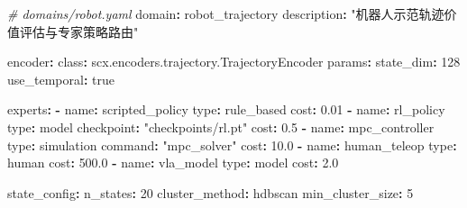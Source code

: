 \documentclass[
  12pt,
]{ctexart}
\newenvironment{Shaded}{}{}
\newcommand{\AttributeTok}[1]{\textcolor[rgb]{0.49,0.56,0.16}{#1}}
\newcommand{\CharTok}[1]{\textcolor[rgb]{0.25,0.44,0.63}{#1}}
\newcommand{\CommentTok}[1]{\textcolor[rgb]{0.38,0.63,0.69}{\textit{#1}}}
\newcommand{\DecValTok}[1]{\textcolor[rgb]{0.25,0.63,0.44}{#1}}
\newcommand{\FloatTok}[1]{\textcolor[rgb]{0.25,0.63,0.44}{#1}}
\newcommand{\FunctionTok}[1]{\textcolor[rgb]{0.02,0.16,0.49}{#1}}
\newcommand{\KeywordTok}[1]{\textcolor[rgb]{0.00,0.44,0.13}{\textbf{#1}}}
\newcommand{\StringTok}[1]{\textcolor[rgb]{0.25,0.44,0.63}{#1}}
\begin{document}
\begin{Shaded}
\begin{Highlighting}[]
\CommentTok{\# domains/robot.yaml}
\FunctionTok{domain}\KeywordTok{:}\AttributeTok{ robot\_trajectory}
\FunctionTok{description}\KeywordTok{:}\AttributeTok{ }\StringTok{"机器人示范轨迹价值评估与专家策略路由"}

\FunctionTok{encoder}\KeywordTok{:}
\AttributeTok{  }\FunctionTok{class}\KeywordTok{:}\AttributeTok{ scx.encoders.trajectory.TrajectoryEncoder}
\AttributeTok{  }\FunctionTok{params}\KeywordTok{:}
\AttributeTok{    }\FunctionTok{state\_dim}\KeywordTok{:}\AttributeTok{ }\DecValTok{128}
\AttributeTok{    }\FunctionTok{use\_temporal}\KeywordTok{:}\AttributeTok{ }\CharTok{true}

\FunctionTok{experts}\KeywordTok{:}
\AttributeTok{  }\KeywordTok{{-}}\AttributeTok{ }\FunctionTok{name}\KeywordTok{:}\AttributeTok{ scripted\_policy}
\AttributeTok{    }\FunctionTok{type}\KeywordTok{:}\AttributeTok{ rule\_based}
\AttributeTok{    }\FunctionTok{cost}\KeywordTok{:}\AttributeTok{ }\FloatTok{0.01}
\AttributeTok{  }\KeywordTok{{-}}\AttributeTok{ }\FunctionTok{name}\KeywordTok{:}\AttributeTok{ rl\_policy}
\AttributeTok{    }\FunctionTok{type}\KeywordTok{:}\AttributeTok{ model}
\AttributeTok{    }\FunctionTok{checkpoint}\KeywordTok{:}\AttributeTok{ }\StringTok{"checkpoints/rl.pt"}
\AttributeTok{    }\FunctionTok{cost}\KeywordTok{:}\AttributeTok{ }\FloatTok{0.5}
\AttributeTok{  }\KeywordTok{{-}}\AttributeTok{ }\FunctionTok{name}\KeywordTok{:}\AttributeTok{ mpc\_controller}
\AttributeTok{    }\FunctionTok{type}\KeywordTok{:}\AttributeTok{ simulation}
\AttributeTok{    }\FunctionTok{command}\KeywordTok{:}\AttributeTok{ }\StringTok{"mpc\_solver"}
\AttributeTok{    }\FunctionTok{cost}\KeywordTok{:}\AttributeTok{ }\FloatTok{10.0}
\AttributeTok{  }\KeywordTok{{-}}\AttributeTok{ }\FunctionTok{name}\KeywordTok{:}\AttributeTok{ human\_teleop}
\AttributeTok{    }\FunctionTok{type}\KeywordTok{:}\AttributeTok{ human}
\AttributeTok{    }\FunctionTok{cost}\KeywordTok{:}\AttributeTok{ }\FloatTok{500.0}
\AttributeTok{  }\KeywordTok{{-}}\AttributeTok{ }\FunctionTok{name}\KeywordTok{:}\AttributeTok{ vla\_model}
\AttributeTok{    }\FunctionTok{type}\KeywordTok{:}\AttributeTok{ model}
\AttributeTok{    }\FunctionTok{cost}\KeywordTok{:}\AttributeTok{ }\FloatTok{2.0}

\FunctionTok{state\_config}\KeywordTok{:}
\AttributeTok{  }\FunctionTok{n\_states}\KeywordTok{:}\AttributeTok{ }\DecValTok{20}
\AttributeTok{  }\FunctionTok{cluster\_method}\KeywordTok{:}\AttributeTok{ hdbscan}
\AttributeTok{  }\FunctionTok{min\_cluster\_size}\KeywordTok{:}\AttributeTok{ }\DecValTok{5}


\end{Highlighting}
\end{Shaded}
\end{document}
